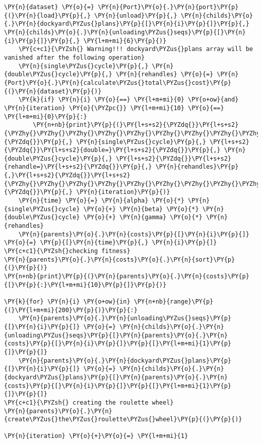 \begin{tcolorbox}[breakable, size=fbox, boxrule=1pt, pad at break*=1mm,colback=cellbackground, colframe=cellborder]
\begin{Verbatim}[commandchars=\\\{\}]
    \PY{n}{dataset} \PY{o}{=} \PY{n}{Port}\PY{o}{.}\PY{n}{port}\PY{p}{(}\PY{n}{load}\PY{p}{,} \PY{n}{unload}\PY{p}{,} \PY{n}{childs}\PY{o}{.}\PY{n}{dockyard\PYZus{}plans}\PY{p}{[}\PY{n}{i}\PY{p}{]}\PY{p}{,} \PY{n}{childs}\PY{o}{.}\PY{n}{unloading\PYZus{}seqs}\PY{p}{[}\PY{n}{i}\PY{p}{]}\PY{p}{,} \PY{l+m+mi}{6}\PY{p}{)}
    \PY{c+c1}{\PYZsh{} Warning!!! dockyard\PYZus{}plans array will be vanished after the following operation}
    \PY{n}{single\PYZus{}cycle}\PY{p}{,} \PY{n}{double\PYZus{}cycle}\PY{p}{,} \PY{n}{rehandles} \PY{o}{=} \PY{n}{Port}\PY{o}{.}\PY{n}{calculate\PYZus{}total\PYZus{}cost}\PY{p}{(}\PY{n}{dataset}\PY{p}{)}
    \PY{k}{if} \PY{n}{i} \PY{o}{==} \PY{l+m+mi}{0} \PY{o+ow}{and} \PY{n}{iteration} \PY{o}{\PYZpc{}} \PY{l+m+mi}{10} \PY{o}{==} \PY{l+m+mi}{0}\PY{p}{:}
        \PY{n+nb}{print}\PY{p}{(}\PY{l+s+s2}{\PYZdq{}}\PY{l+s+s2}{\PYZhy{}\PYZhy{}\PYZhy{}\PYZhy{}\PYZhy{}\PYZhy{}\PYZhy{}\PYZhy{}\PYZhy{}\PYZhy{}\PYZhy{}\PYZhy{}single=}\PY{l+s+s2}{\PYZdq{}}\PY{p}{,} \PY{n}{single\PYZus{}cycle}\PY{p}{,} \PY{l+s+s2}{\PYZdq{}}\PY{l+s+s2}{double=}\PY{l+s+s2}{\PYZdq{}}\PY{p}{,} \PY{n}{double\PYZus{}cycle}\PY{p}{,} \PY{l+s+s2}{\PYZdq{}}\PY{l+s+s2}{rehandle=}\PY{l+s+s2}{\PYZdq{}}\PY{p}{,} \PY{n}{rehandles}\PY{p}{,}\PY{l+s+s2}{\PYZdq{}}\PY{l+s+s2}{\PYZhy{}\PYZhy{}\PYZhy{}\PYZhy{}\PYZhy{}\PYZhy{}\PYZhy{}\PYZhy{}\PYZhy{}\PYZhy{}\PYZhy{}\PYZhy{}\PYZhy{}\PYZhy{}}\PY{l+s+s2}{\PYZdq{}}\PY{p}{,} \PY{n}{iteration}\PY{p}{)}
    \PY{n}{time} \PY{o}{=} \PY{n}{alpha} \PY{o}{*} \PY{n}{single\PYZus{}cycle} \PY{o}{+} \PY{n}{beta} \PY{o}{*} \PY{n}{double\PYZus{}cycle} \PY{o}{+} \PY{n}{gamma} \PY{o}{*} \PY{n}{rehandles}
    \PY{n}{parents}\PY{o}{.}\PY{n}{costs}\PY{p}{[}\PY{n}{i}\PY{p}{]} \PY{o}{=} \PY{p}{[}\PY{n}{time}\PY{p}{,} \PY{n}{i}\PY{p}{]}
\PY{c+c1}{\PYZsh{}checking fitness}
\PY{n}{parents}\PY{o}{.}\PY{n}{costs}\PY{o}{.}\PY{n}{sort}\PY{p}{(}\PY{p}{)}
\PY{n+nb}{print}\PY{p}{(}\PY{n}{parents}\PY{o}{.}\PY{n}{costs}\PY{p}{[}\PY{p}{:}\PY{l+m+mi}{10}\PY{p}{]}\PY{p}{)}

\PY{k}{for} \PY{n}{i} \PY{o+ow}{in} \PY{n+nb}{range}\PY{p}{(}\PY{l+m+mi}{200}\PY{p}{)}\PY{p}{:}
    \PY{n}{parents}\PY{o}{.}\PY{n}{unloading\PYZus{}seqs}\PY{p}{[}\PY{n}{i}\PY{p}{]} \PY{o}{=} \PY{n}{childs}\PY{o}{.}\PY{n}{unloading\PYZus{}seqs}\PY{p}{[}\PY{n}{parents}\PY{o}{.}\PY{n}{costs}\PY{p}{[}\PY{n}{i}\PY{p}{]}\PY{p}{[}\PY{l+m+mi}{1}\PY{p}{]}\PY{p}{]}
    \PY{n}{parents}\PY{o}{.}\PY{n}{dockyard\PYZus{}plans}\PY{p}{[}\PY{n}{i}\PY{p}{]} \PY{o}{=} \PY{n}{childs}\PY{o}{.}\PY{n}{dockyard\PYZus{}plans}\PY{p}{[}\PY{n}{parents}\PY{o}{.}\PY{n}{costs}\PY{p}{[}\PY{n}{i}\PY{p}{]}\PY{p}{[}\PY{l+m+mi}{1}\PY{p}{]}\PY{p}{]}
\PY{c+c1}{\PYZsh{} creating the roulette wheel}
\PY{n}{parents}\PY{o}{.}\PY{n}{create\PYZus{}the\PYZus{}roulette\PYZus{}wheel}\PY{p}{(}\PY{p}{)}

\PY{n}{iteration} \PY{o}{+}\PY{o}{=} \PY{l+m+mi}{1}
\end{Verbatim}
\end{tcolorbox}




